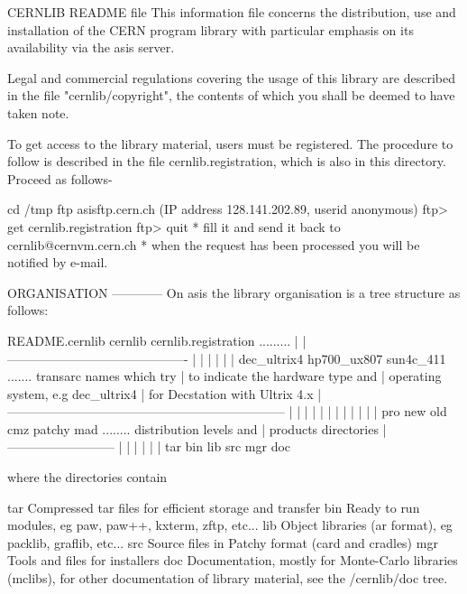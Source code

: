 \begin{XMPt}{CERNLIB README file} 
This information file concerns the distribution, use and installation of
the CERN program library with particular emphasis on its availability
via the asis server.
 
Legal and commercial regulations covering the usage of this library are
described in the file "cernlib/copyright", the contents of which you
shall be deemed to have taken note.
 
To get access to the library material, users must be registered. The
procedure to follow is described in the file cernlib.registration,
which is also in this directory. Proceed as follows-
 
 cd /tmp
  ftp asisftp.cern.ch
 (IP address 128.141.202.89, userid anonymous)
 ftp> get cernlib.registration
 ftp> quit
* fill it and send it back to cernlib@cernvm.cern.ch
* when the request has been processed you will be notified by e-mail.
 
 
ORGANISATION
------------
On asis the library organisation is a tree structure as follows:
 
  README.cernlib   cernlib    cernlib.registration   .........
		      |
		      |
      -------------------------------------------
      |            |           |         |  |   |
 dec_ultrix4  hp700_ux807  sun4c_411   .......  transarc names which try
      |                                to indicate the hardware type and
      |                                operating system, e.g dec_ultrix4
      |                                for Decstation with Ultrix 4.x
      |
    ------------------------------------------------------------------
    |    |    |    |     |      |       |    |     |      |      |   |
   pro  new  old  cmz  patchy  mad  ........ distribution levels and
         |                                   products directories
	 |
    --------------------------
    |    |    |    |    |    |
   tar  bin  lib  src  mgr  doc
 
where the directories contain
 
tar    Compressed tar files for efficient storage and transfer
bin    Ready to run modules, eg paw, paw++, kxterm, zftp, etc...
lib    Object libraries (ar format), eg packlib, graflib, etc...
src    Source files in Patchy format (card and cradles)
mgr    Tools and files for installers
doc    Documentation, mostly for Monte-Carlo libraries (mclibs),
       for other documentation of library material, see the /cernlib/doc
       tree.
 

\end{XMPt}
